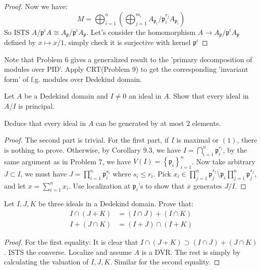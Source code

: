 \documentclass{solution}
\begin{document}
\begin{proof}
    Now we have:
    $$M = \bigoplus_{i = 1}^n \left(\bigoplus_{j = 1}^{m_i} A_{\mathfrak{p}_i} / \mathfrak{p}_i^{r_j}A_{\mathfrak{p}_i}\right)$$
    So ISTS $A / \mathfrak{p}^i A \cong A_{\mathfrak{p}} / \mathfrak{p}^i A_{\mathfrak{p}}$. Let's consider the homomorphism $A \rightarrow A_{\mathfrak{p}} / \mathfrak{p}^i A_{\mathfrak{p}}$ defined by $x \mapsto \overline{x / 1}$, simply check it is surjective with kernel $\mathfrak{p}^i$
\end{proof}

{\color{red} Note that Problem 6 gives a generalized result to the 'primary decomposition of modules over PID'. Apply CRT(Problem 9) to get the corresponding 'invariant form' of f.g. modules over Dedekind domain.}

\begin{problem}
    Let $A$ be a Dedekind domain and $I \ne 0$ an ideal in $A$. Show that every ideal in $A / I$ is principal.

    Deduce that every ideal in $A$ can be generated by at most $2$ elements.
\end{problem}

\begin{proof}
    The second part is trivial. For the first part, if $I$ is maximal or $(1)$, there is nothing to prove. Otherwise, by Corollary 9.3, we have $I = \bigcap\limits_{i = 1}^{n} \mathfrak{p}_i^{r_i}$, by the same argument as in Problem 7, we have $V(I) = \left\lbrace \mathfrak{p}_i \right\rbrace_{i = 1}^n$. Now take arbitrary $J \subset I$, we must have $J = \prod\limits_{i = 1}^{n} \mathfrak{p}_i^{s_i}$ where $s_i \le r_i$. Pick $x_i \in \prod\limits_{j = 1}^{n}\mathfrak{p}_j^{s_j} \setminus \mathfrak{p}_i \prod\limits_{j = 1}^{n} \mathfrak{p}_j^{s_j}$, and let $x = \sum\limits_{i = 1}^{n} x_i$. Use localization at $\mathfrak{p}_i$'s to show that $\overline{x}$ generates $J / I$.
\end{proof}

\begin{problem}
    Let $I, J, K$ be three ideals in a Dedekind domain. Prove that:
    $$
        \begin{aligned}
        I \cap (J + K) &= (I \cap J) + (I \cap K) \\
        I + (J \cap K) &= (I + J) \cap (I + K)
    \end{aligned}
    $$
\end{problem}

\begin{proof}
    For the first equality: It is clear that $I \cap (J + K) \supset (I \cap J) + (J \cap K)$. ISTS the converse. Localize and assume $A$ is a DVR. The rest is simply by calculating the valuation of $I, J, K$. Similar for the second equality.
\end{proof}
\end{document}
